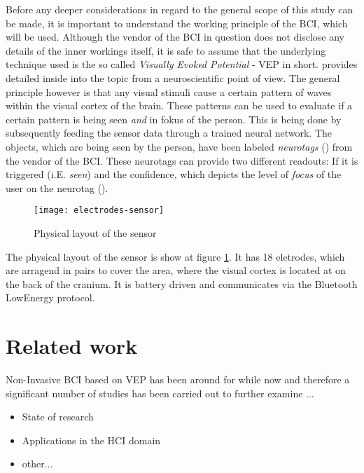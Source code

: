             Before any deeper considerations in regard to the general scope of this study can be made, it is important to understand the working principle of the BCI, which will be used. Although the vendor of the BCI in question does not disclose any details of the inner workings itself, it is safe to assume that the underlying technique used is the so called \textit{Visually Evoked Potential} - VEP in short. \cite{Sokol.1976} provides detailed inside into the topic from a neuroscientific point of view. The general principle however is that any visual stimuli cause a certain pattern of waves within the visual cortex of the brain. These patterns can be used to evaluate if a certain pattern is being seen \textit{and} in fokus of the person. This is being done by subsequently feeding the sensor data through a trained neural network. The objects, which are being seen by the person, have been labeled \textit{neurotags} (\cite{NextMind.23112020}) from the vendor of the BCI. These neurotags can provide two different readouts: If it is triggered (i.E. \textit{seen}) and the confidence, which depicts the level of \textit{focus} of the user on the neurotag (\cite{NextMind.18112020}).
            
            \begin{figure}[h]     %
                \centering
                \texttt{[image: electrodes-sensor]} 
                \caption{Physical layout of the sensor}\label{electrodes-sensor}
            \end{figure}
            
            The physical layout of the sensor is show at figure \ref*{electrodes-sensor}. It has 18 eletrodes, which are arragend in pairs to cover the area, where the visual cortex is located at on the back of the cranium. It is battery driven and communicates via the Bluetooth LowEnergy protocol.

        \section{Related work}

            Non-Invasive BCI based on VEP has been around for while now and therefore a significant number of studies has been carried out to further examine ... 

            \begin{itemize}
                \item State of research
                \item Applications in the HCI domain
                \item other...
            \end{itemize}

